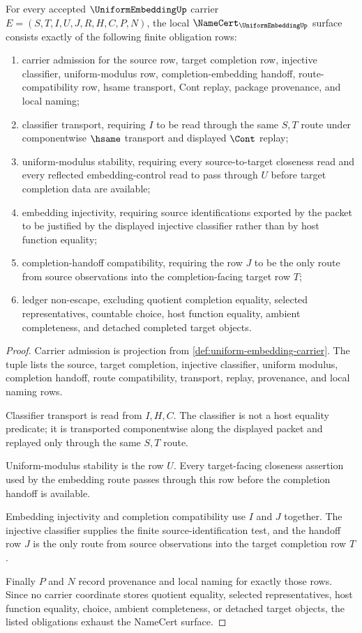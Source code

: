\begin{theorem}
\label{thm:uniform-embedding-namecert-obligations}
For every accepted $\UniformEmbeddingUp$ carrier $E=(S,T,I,U,J,R,H,C,P,N)$, the local $\NameCert_{\UniformEmbeddingUp}$ surface consists exactly of the following finite obligation rows:
\begin{enumerate}
\item carrier admission for the source row, target completion row, injective classifier, uniform-modulus row, completion-embedding handoff, route-compatibility row, hsame transport, Cont replay, package provenance, and local naming;
\item classifier transport, requiring $I$ to be read through the same $S,T$ route under componentwise $\hsame$ transport and displayed $\Cont$ replay;
\item uniform-modulus stability, requiring every source-to-target closeness read and every reflected embedding-control read to pass through $U$ before target completion data are available;
\item embedding injectivity, requiring source identifications exported by the packet to be justified by the displayed injective classifier rather than by host function equality;
\item completion-handoff compatibility, requiring the row $J$ to be the only route from source observations into the completion-facing target row $T$;
\item ledger non-escape, excluding quotient completion equality, selected representatives, countable choice, host function equality, ambient completeness, and detached completed target objects.
\end{enumerate}
\end{theorem}
\begin{proof}
Carrier admission is projection from \autoref{def:uniform-embedding-carrier}. The tuple lists the source, target completion, injective classifier, uniform modulus, completion handoff, route compatibility, transport, replay, provenance, and local naming rows.

Classifier transport is read from $I,H,C$. The classifier is not a host equality predicate; it is transported componentwise along the displayed packet and replayed only through the same $S,T$ route.

Uniform-modulus stability is the row $U$. Every target-facing closeness assertion used by the embedding route passes through this row before the completion handoff is available.

Embedding injectivity and completion compatibility use $I$ and $J$ together. The injective classifier supplies the finite source-identification test, and the handoff row $J$ is the only route from source observations into the target completion row $T$.

Finally $P$ and $N$ record provenance and local naming for exactly those rows. Since no carrier coordinate stores quotient equality, selected representatives, host function equality, choice, ambient completeness, or detached target objects, the listed obligations exhaust the NameCert surface.
\end{proof}

